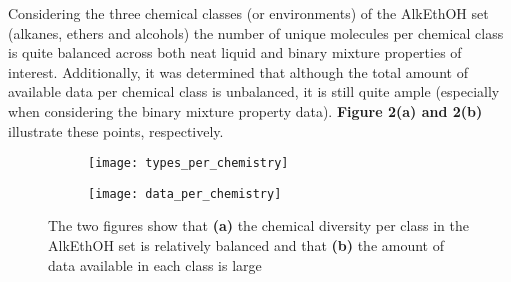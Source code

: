 \documentclass[rmp,nofootinbib,superscriptaddress,12pt,tightenlines,notitlepage]{revtex4-1}
\begin{document}
Considering the three chemical classes (or environments) of the AlkEthOH set (alkanes, ethers and alcohols) the number of unique molecules per chemical class is quite balanced 
across both neat liquid and binary mixture properties of interest. Additionally, it was determined that although the total amount of available data per chemical class is unbalanced, it is still quite ample (especially when considering the binary mixture property data). \textbf{Figure 2(a) and 2(b)} illustrate these
points, respectively.
\begin{figure}[h!]
\centering
\begin{subfigure}{.5\textwidth}
  \centering
  \texttt{[image: types\_per\_chemistry]}
  \label{fig:sub1}
\end{subfigure}%
\begin{subfigure}{.5\textwidth}
  \centering
  \texttt{[image: data\_per\_chemistry]}
  \label{fig:sub2}
\end{subfigure}
\caption{The two figures show that \textbf{(a)} the chemical diversity per class in the AlkEthOH set is relatively balanced and that \textbf{(b)} the amount of data available in each class is large}
\label{fig:test}
\end{figure}
\end{document}
